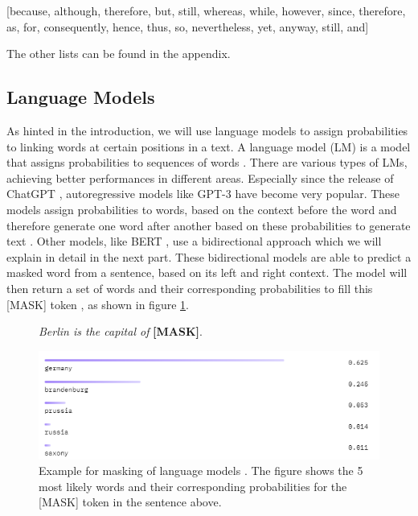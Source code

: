 \begin{center}
	[because, although, therefore, but, still, whereas, while, however, since, therefore, as, for, consequently, hence, thus, so, nevertheless, yet, anyway, still, and]
\end{center}

The other lists can be found in the appendix.

\subsection{Language Models}
As hinted in the introduction, we will use language models to assign probabilities to linking words at certain positions in a text. A language model (LM) is a model that assigns probabilities to sequences of words \cite{languagemodels2023}. There are various types of LMs, achieving better performances in different areas. Especially since the release of ChatGPT \cite{chatgpt}, autoregressive models like GPT-3 have become very popular. These models assign probabilities to words, based on the context before the word and therefore generate one word after another based on these probabilities to generate text \cite{gpt3}. Other models, like BERT \cite{bert}, use a bidirectional approach which we will explain in detail in the next part. These bidirectional models are able to predict a masked word from a sentence, based on its left and right context. The model will then return a set of words and their corresponding probabilities to fill this [MASK] token \cite{bert}, as shown in figure \ref{fig:bert_masking_example}.

\begin{figure}[H]
  \begin{center}
	\textit{Berlin is the capital of} \textbf{[MASK]}.
  \end{center}
  \centering
  \includegraphics[scale=0.9]{fig/bert_masking_example.png}
  \caption{Example for masking of language models \cite{bertexample}. The figure shows the 5 most likely words and their corresponding probabilities for the [MASK] token in the sentence above.}%
  \label{fig:bert_masking_example}
\end{figure}

